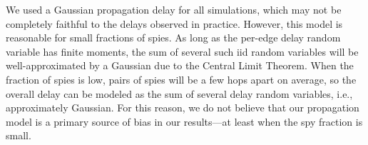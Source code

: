We used a Gaussian propagation delay for all simulations, which may not be completely faithful to the delays observed in practice. However, this model is reasonable for small fractions of spies. As long as the per-edge delay random variable has finite moments, the sum of several such iid random variables will be well-approximated by a Gaussian due to the Central Limit Theorem. When the fraction of spies is low, pairs of spies will be a few hops apart on average, so the overall delay can be modeled as the sum of several delay random variables, i.e., approximately Gaussian. For this reason, we do not believe that our propagation model is a primary source of bias in our results---at least when the spy fraction is small.
